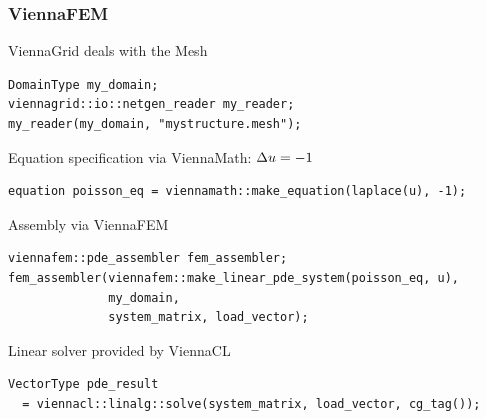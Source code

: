\begin{frame}[fragile]
\frametitle{ViennaFEM}

\begin{block}{ViennaGrid deals with the Mesh}
\begin{lstlisting}[basicstyle=\scriptsize\ttfamily]
DomainType my_domain;
viennagrid::io::netgen_reader my_reader;
my_reader(my_domain, "mystructure.mesh");
\end{lstlisting}
\end{block}

\begin{block}{Equation specification via ViennaMath: $\color{black} \Delta u = -1$}
\begin{lstlisting}[basicstyle=\scriptsize\ttfamily]
equation poisson_eq = viennamath::make_equation(laplace(u), -1);
\end{lstlisting}
\end{block}


\begin{block}{Assembly via ViennaFEM}
\begin{lstlisting}[basicstyle=\scriptsize\ttfamily]
viennafem::pde_assembler fem_assembler;
fem_assembler(viennafem::make_linear_pde_system(poisson_eq, u),
              my_domain,
              system_matrix, load_vector);
\end{lstlisting}
\end{block}

\begin{block}{Linear solver provided by ViennaCL}
\begin{lstlisting}[basicstyle=\scriptsize\ttfamily]
VectorType pde_result 
  = viennacl::linalg::solve(system_matrix, load_vector, cg_tag());
\end{lstlisting}
\end{block}
 
\end{frame}



